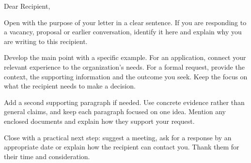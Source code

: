 {\large\bfseries\color{accent}}

Dear Recipient,

Open with the purpose of your letter in a clear sentence. If you are responding
to a vacancy, proposal or earlier conversation, identify it here and explain
why you are writing to this recipient.

Develop the main point with a specific example. For an application, connect
your relevant experience to the organization's needs. For a formal request,
provide the context, the supporting information and the outcome you seek.
Keep the focus on what the recipient needs to make a decision.

Add a second supporting paragraph if needed. Use concrete evidence rather than
general claims, and keep each paragraph focused on one idea. Mention any
enclosed documents and explain how they support your request.

Close with a practical next step: suggest a meeting, ask for a response by an
appropriate date or explain how the recipient can contact you. Thank them for
their time and consideration.

